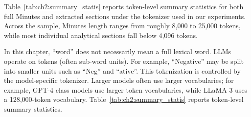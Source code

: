 Table~\ref{tab:ch2:summary_statis} reports token-level summary statistics for both full Minutes and extracted sections under the tokenizer used in our experiments. Across the sample, Minutes length ranges from roughly 8,000 to 25,000 tokens, while most individual analytical sections fall below 4,096 tokens.

In this chapter, ``word'' does not necessarily mean a full lexical word. LLMs operate on tokens (often sub-word units). For example, ``Negative'' may be split into smaller units such as ``Neg'' and ``ative''. This tokenization is controlled by the model-specific tokenizer. Larger models often use larger vocabularies; for example, GPT-4 class models use larger token vocabularies, while LLaMA 3 uses a 128,000-token vocabulary. Table~\ref{tab:ch2:summary_statis} reports token-level summary statistics.


